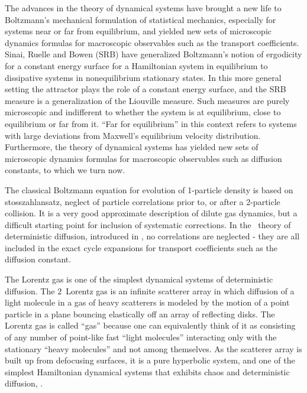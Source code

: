 


The advances in the theory of dynamical systems have brought a new life
to Boltzmann's mechanical formulation of statistical mechanics,
especially for systems near or far from equilibrium, and yielded new sets
of microscopic dynamics formulas for macroscopic observables such as the
transport coefficients. Sinai, Ruelle and Bowen (SRB) have generalized
Boltzmann's notion of ergodicity for a constant energy surface for a
Hamiltonian system in equilibrium to dissipative systems in
{nonequilibrium} stationary states. In this more
general setting the attractor plays the role of a constant energy
surface, and the SRB measure is a generalization of the Liouville
measure. Such measures are purely microscopic and indifferent to whether
the system is at equilibrium, close to equilibrium or far from it. ``Far
for equilibrium'' in this context refers to systems with large deviations
from Maxwell's equilibrium velocity distribution. Furthermore, the theory
of dynamical systems has yielded new sets of microscopic dynamics
formulas for macroscopic observables such as diffusion constants, to
which we turn now.

The classical Boltzmann equation for evolution of 1-particle density is
based on stosszahlansatz, neglect of particle correlations prior to, or
after a 2-particle collision. It is a very good approximate description
of dilute gas dynamics, but a difficult starting point for inclusion of
systematic corrections. In the \po\ theory of deterministic diffusion,
introduced in , no correlations are
neglected - they are all included in the exact cycle expansions for
transport coefficients such as the diffusion constant.

The Lorentz gas is one of the simplest dynamical
systems of deterministic diffusion. The $2$\dmn\ Lorentz gas is an
infinite scatterer array in which diffusion of a light molecule in a gas
of heavy scatterers is modeled by the motion of a point particle in a
plane bouncing elastically off an array of reflecting disks. The Lorentz
gas is called ``gas'' because one can equivalently think of it as
consisting of any number of point-like fast ``light molecules''
interacting only with the stationary ``heavy molecules'' and not among
themselves.  As the scatterer array is built up from defocusing surfaces,
it is a pure hyperbolic system, and one of the simplest Hamiltonian
dynamical systems that exhibits chaos and deterministic diffusion,
.

